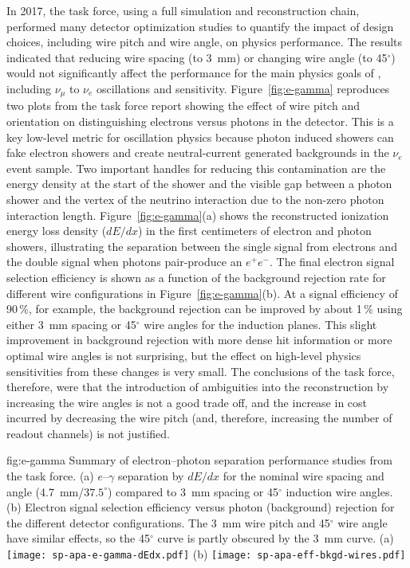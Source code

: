 \begin{itemize}
In 2017, the   task force, using a full  simulation and reconstruction chain, performed many detector optimization studies to quantify the impact of design choices, including wire pitch and wire angle, on  physics performance.  The results indicated that reducing wire spacing (to \SI{3}{mm}) or changing wire angle (to \num{45}$^\circ$) would not significantly affect the performance for the main physics goals of , including $\nu_\mu $ to $\nu_e$ oscillations and  sensitivity.  Figure~\ref{fig:e-gamma} reproduces two plots from the task force report showing the effect of wire pitch and orientation on distinguishing electrons versus photons in the detector.  This is a key low-level metric for oscillation physics because photon induced showers can fake electron showers and create neutral-current generated backgrounds in the $\nu_e$  event sample. Two important handles for reducing this contamination are the energy density at the start of the shower and the visible gap between a photon shower and the vertex of the neutrino interaction due to the non-zero photon interaction length.  Figure~\ref{fig:e-gamma}(a) shows the reconstructed ionization energy loss density ($dE/dx$) in the first centimeters of electron and photon showers, illustrating the separation between the single  signal from electrons and the double  signal when photons pair-produce an $e^+e^-$.  The final electron signal selection efficiency is shown as a function of the background rejection rate for different wire configurations in Figure~\ref{fig:e-gamma}(b). At a signal efficiency of \num{90}\,\%, for example, the background rejection can be improved by about \num{1}\,\% using either \SI{3}{mm} spacing or 45$^\circ$ wire angles for the induction planes.  This slight improvement in background rejection with more dense hit information or more optimal wire angles is not surprising, but the effect on high-level physics sensitivities from these changes is very small. The conclusions of the  task force, therefore, were that the introduction of ambiguities into the reconstruction by increasing the wire angles is not a good trade off, and the increase in cost incurred by decreasing the wire pitch (and, therefore, increasing the number of readout channels) is not justified.  

\begin{dunefigure}{fig:e-gamma}
{Summary of electron--photon separation performance studies from the   task force. (a) $e$--$\gamma$ separation by $dE/dx$ for the nominal wire spacing and angle (\SI{4.7}{mm}/$37.5^\circ$) compared to \SI{3}{mm} spacing or 45$^\circ$ induction wire angles. (b) Electron signal selection efficiency versus photon (background) rejection for the different detector configurations. The \SI{3}{mm} wire pitch and 45$^\circ$ wire angle have similar effects, so the 45$^\circ$ curve is partly obscured by the \SI{3}{mm} curve.}
(a)
\texttt{[image: sp-apa-e-gamma-dEdx.pdf]} \qquad
(b)
\texttt{[image: sp-apa-eff-bkgd-wires.pdf]} 
\end{dunefigure}


\end{itemize}
